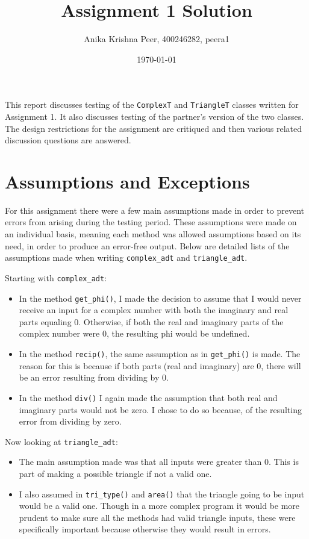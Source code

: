 \documentclass[12pt]{article}
\title{Assignment 1 Solution}
\author{Anika Krishna Peer, 400246282, peera1}
\date{\today}
\begin{document}
\maketitle

This report discusses testing of the \verb|ComplexT| and \verb|TriangleT|
classes written for Assignment 1. It also discusses testing of the partner's
version of the two classes. The design restrictions for the assignment
are critiqued and then various related discussion questions are answered.

\section{Assumptions and Exceptions} \label{AssumptAndExcept}
For this assignment there were a few main assumptions made in order to prevent errors 
from arising during the testing period. These assumptions were made on an individual basis,
meaning each method was allowed assumptions based on its need, in order to produce an 
error-free output. 
Below are detailed lists of the assumptions made when writing \verb|complex_adt| and \verb|triangle_adt|.\newline

Starting with \verb|complex_adt|:
\begin{itemize}
	\item In the method \verb|get_phi()|, I made the decision to assume that I would
	never receive an input for a complex number with both the imaginary and real parts 
	equaling 0. Otherwise, if both the real and imaginary parts of the complex number
	were 0, the resulting phi would be undefined.
	\item In the method \verb|recip()|, the same assumption as in \verb|get_phi()| is
	made. The reason for this is because if both parts (real and imaginary) are 0, there will be an error
	resulting from dividing by 0. 
	\item In the method \verb|div()| I again made the assumption that both real and imaginary
	parts would not be zero. I chose to do so because, of the resulting error from dividing 
	by zero.
\end{itemize} 
\newpage
Now looking at \verb|triangle_adt|:
\begin{itemize}
	\item The main assumption made was that all inputs were greater than 0. This is part
	of making a possible triangle if not a valid one.
	\item I also assumed in \verb|tri_type()| and \verb|area()| that the triangle going to be input would be a valid one. Though in a more complex program it would be more prudent to make sure all the methods had valid triangle inputs, these were specifically important because otherwise they would result in errors. 

\end{itemize}
\end{document}
